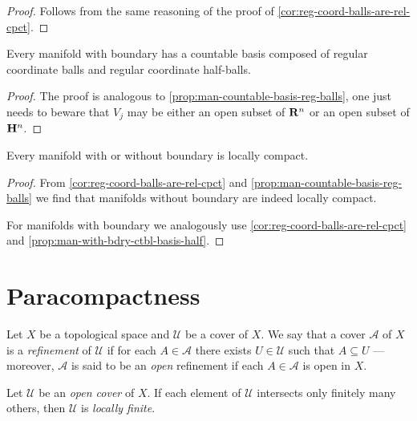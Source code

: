\begin{proof}
Follows from the same reasoning of the proof of
\cref{cor:reg-coord-balls-are-rel-cpct}.
\end{proof}

\begin{proposition}
\label{prop:man-with-bdry-ctbl-basis-half}
Every manifold with boundary has a countable basis composed of regular
coordinate balls and regular coordinate half-balls.
\end{proposition}

\begin{proof}
The proof is analogous to \cref{prop:man-countable-basis-reg-balls}, one just
needs to beware that \(V_j\) may be either an open subset of \(\mathbf{R}^n\) or an open
subset of \(\mathbf{H}^n\).
\end{proof}

\begin{proposition}
\label{prop:manifold-locally-compact}
Every manifold with or without boundary is locally compact.
\end{proposition}

\begin{proof}
From \cref{cor:reg-coord-balls-are-rel-cpct} and
\cref{prop:man-countable-basis-reg-balls} we find that manifolds without
boundary are indeed locally compact.

For manifolds with boundary we analogously use
\cref{cor:reg-coord-balls-are-rel-cpct} and
\cref{prop:man-with-bdry-ctbl-basis-half}.
\end{proof}


\section{Paracompactness}

\begin{definition}
\label{def:cover-refinement}
Let \(X\) be a topological space and \(\mathcal{U}\) be a cover of
\(X\). We say that a cover \(\mathcal{A}\) of \(X\) is a \emph{refinement} of
\(\mathcal{U}\) if for each \(A \in \mathcal{A}\) there exists
\(U \in \mathcal{U}\) such that \(A \subseteq U\) --- moreover, \(\mathcal{A}\)
is said to be an \emph{open} refinement if each \(A \in \mathcal{A}\) is open in
\(X\).
\end{definition}

\begin{corollary}
\label{cor:open-cover-finite-intersection-is-locally-finite}
Let \(\mathcal{U}\) be an \emph{open cover} of \(X\). If each element of
\(\mathcal{U}\) intersects only finitely many others, then \(\mathcal{U}\) is
\emph{locally finite}.
\end{corollary}

